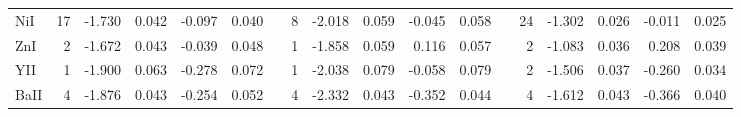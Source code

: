 \documentclass{aa}
\begin{document}
\begin{appendix}
\begin{landscape}
\begin{longtable}{lrrrrrrrrrrrrrrrrr}
NiI  &     17&    -1.730&     0.042&    -0.097&     0.040&&      8&    -2.018&     0.059&    -0.045&     0.058&&     24&    -1.302&     0.026&    -0.011&     0.025\\
ZnI  &      2&    -1.672&     0.043&    -0.039&     0.048&&      1&    -1.858&     0.059&     0.116&     0.057&&      2&    -1.083&     0.036&     0.208&     0.039\\
YII  &      1&    -1.900&     0.063&    -0.278&     0.072&&      1&    -2.038&     0.079&    -0.058&     0.079&&      2&    -1.506&     0.037&    -0.260&     0.034\\
BaII &      4&    -1.876&     0.043&    -0.254&     0.052&&      4&    -2.332&     0.043&    -0.352&     0.044&&      4&    -1.612&     0.043&    -0.366&     0.040
\end{longtable}
\end{landscape}


\end{appendix}
\end{document}
